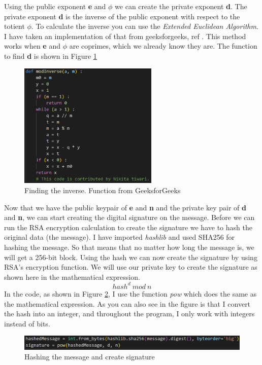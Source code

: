 \documentclass[12pt, letterpaper]{article}
\begin{document}
Using the public exponent \textbf{e} and $\phi$ we can create the private exponent \textbf{d}. The private exponent \textbf{d} is the inverse of the public exponent with respect to the totient $\phi$. To calculate the inverse you can use the \textit{Extended Euclidean Algorithm}. I have taken an implementation of that from geeksforgeeks, ref \cite{modinv}. This method works when \textbf{e} and $\phi$ are coprimes, which we already know they are. The function to find \textbf{d} is shown in Figure \ref{fig:modinv}

\begin{figure}[H]
  \includegraphics[width=250px]{code_snippets/modinv.PNG}\centering
  \caption{Finding the inverse. Function from GeeksforGeeks}
  \label{fig:modinv}
\end{figure}

Now that we have the public keypair of \textbf{e} and \textbf{n} and the private key pair of \textbf{d} and \textbf{n}, we can start creating the digital signature on the message. Before we can run the RSA encryption calculation to create the signature we have to hash the original data (the message). I have imported \textit{hashlib} and used SHA256 for hashing the message. So that means that no matter how long the message is, we will get a 256-bit block.
Using the hash we can now create the signature by using RSA's encryption function. We will use our private key to create the signature as shown here in the mathematical expression.
$$hash^{d}\ mod\ n$$
In the code, as shown in Figure \ref{fig:hash}, I use the function \textit{pow} which does the same as the mathematical expression. As you can also see in the figure is that I convert the hash into an integer, and throughout the program, I only work with integers instead of bits.

\begin{figure}[H]
  \includegraphics[width=\linewidth]{code_snippets/hash.PNG}\centering
  \caption{Hashing the message and create signature}
  \label{fig:hash}
\end{figure}
\end{document}
